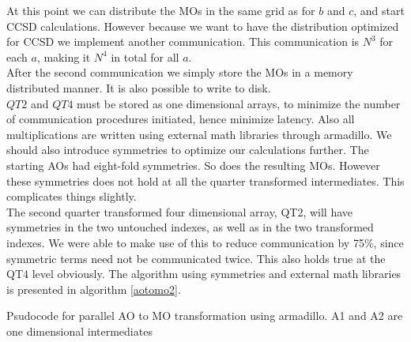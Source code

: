 At this point we can distribute the MOs in the same grid as for $b$ and $c$, and start CCSD calculations. However because we want to have the distribution optimized for CCSD we implement another communication. This communication is $N^3$ for each $a$, making it $N^4$ in total for all $a$. \\

After the second communication we simply store the MOs in a memory distributed manner. It is also possible to write to disk. \\

$QT2$ and $QT4$ must be stored as one dimensional arrays, to minimize the number of communication procedures initiated, hence minimize latency. Also all multiplications are written using external math libraries through armadillo. We should also introduce symmetries to optimize our calculations further. The starting AOs had eight-fold symmetries. So does the resulting MOs. However these symmetries does not hold at all the quarter transformed intermediates. This complicates things slightly. \\

The second quarter transformed four dimensional array, QT2, will have symmetries in the two untouched indexes, as well as in the two transformed indexes. We were able to make use of this to reduce communication by 75\%, since symmetric terms need not be communicated twice. This also holds true at the QT4 level obviously. The algorithm using symmetries and external math libraries is presented in algorithm \ref{aotomo2}. \\

\begin{algorithm}
  
 \caption{Psudocode for parallel AO to MO transformation using armadillo. A1 and A2 are one dimensional intermediates}
 \label{aotomo2}
\end{algorithm}

